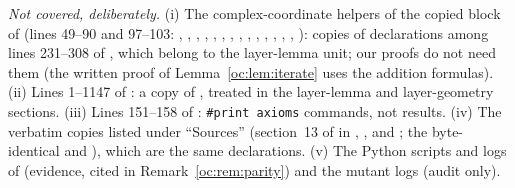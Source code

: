 \emph{Not covered, deliberately.} (i) The complex-coordinate helpers of the copied block of
 (lines 49--90 and 97--103: , , , ,
, , , , , ,
, , , , ): copies
of declarations among lines 231--308 of , which belong to the
layer-lemma unit; our proofs do not need them (the written proof of Lemma~\ref{oc:lem:iterate} uses the
addition formulas). (ii) Lines 1--1147 of : a copy of ,
treated in the layer-lemma and layer-geometry sections. (iii) Lines 151--158 of :
\texttt{\#print axioms} commands, not results. (iv) The verbatim copies listed under ``Sources'' (section~13
of  in , ,
 and ; the byte-identical
 and ), which
are the same declarations. (v) The Python scripts and logs of  (evidence, cited in
Remark~\ref{oc:rem:parity}) and the mutant logs (audit only).
\endgroup
